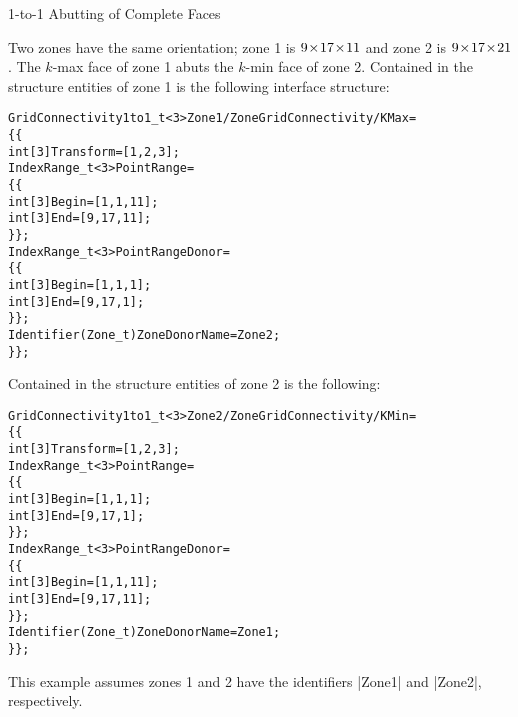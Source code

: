 \begin{example}{1-to-1 Abutting of Complete Faces}
\label{ex:1to1a}

Two zones have the same orientation; zone 1 is $9\!\times\! 17\!\times\! 11$ and 
zone 2 is $9\!\times\! 17\!\times\! 21$.
The $k$-max face of zone 1 abuts the $k$-min face of zone 2.
Contained in the structure entities of zone 1 is the following interface
structure:
\begin{alltt}
  GridConnectivity1to1\_t<3> Zone1/ZoneGridConnectivity/KMax =
    \{\{
    int[3] Transform = [1,2,3] ;
    IndexRange\_t<3> PointRange =
      \{\{
      int[3] Begin = [1,1,11] ;
      int[3] End   = [9,17,11] ;
      \}\} ;
    IndexRange\_t<3> PointRangeDonor =
      \{\{
      int[3] Begin = [1,1,1] ; 
      int[3] End   = [9,17,1] ;
      \}\} ;
    Identifier(Zone\_t) ZoneDonorName = Zone2 ;
    \}\} ;
\end{alltt}
Contained in the structure entities of zone 2 is the following:
\begin{alltt}
  GridConnectivity1to1\_t<3> Zone2/ZoneGridConnectivity/KMin =
    \{\{
    int[3] Transform = [1,2,3] ;
    IndexRange\_t<3> PointRange =
      \{\{
      int[3] Begin = [1,1,1] ; 
      int[3] End   = [9,17,1] ;
      \}\} ;
    IndexRange\_t<3> PointRangeDonor =
      \{\{
      int[3] Begin = [1,1,11] ;
      int[3] End   = [9,17,11] ;
      \}\} ;
    Identifier(Zone\_t) ZoneDonorName = Zone1 ;
    \}\} ;
\end{alltt}
\end{example}
This example assumes zones 1 and 2 have the identifiers |Zone1| and |Zone2|,
respectively.    

